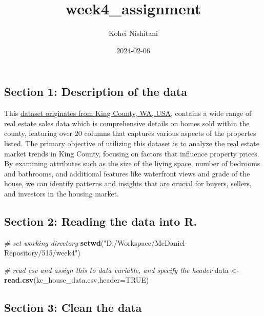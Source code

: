\documentclass[
]{article}
\title{week4\_assignment}
\author{Kohei Nishitani}
\date{2024-02-06}
\newenvironment{Shaded}{\begin{snugshade}}{\end{snugshade}}
\newcommand{\AttributeTok}[1]{\textcolor[rgb]{0.13,0.29,0.53}{#1}}
\newcommand{\CommentTok}[1]{\textcolor[rgb]{0.56,0.35,0.01}{\textit{#1}}}
\newcommand{\ConstantTok}[1]{\textcolor[rgb]{0.56,0.35,0.01}{#1}}
\newcommand{\FunctionTok}[1]{\textcolor[rgb]{0.13,0.29,0.53}{\textbf{#1}}}
\newcommand{\NormalTok}[1]{#1}
\newcommand{\OtherTok}[1]{\textcolor[rgb]{0.56,0.35,0.01}{#1}}
\newcommand{\StringTok}[1]{\textcolor[rgb]{0.31,0.60,0.02}{#1}}
\begin{document}
\maketitle

{
\setcounter{tocdepth}{2}
\tableofcontents
}
\hypertarget{section-1-description-of-the-data}{%
\subsection{Section 1: Description of the
data}\label{section-1-description-of-the-data}}

This
\href{https://www.kaggle.com/datasets/harlfoxem/housesalesprediction/data}{dataset
originates from King County, WA, USA}, contains a wide range of real
estate sales data which is comprehensive details on homes sold within
the county, featuring over 20 columns that captures various aspects of
the propertes listed. The primary objective of utilizing this dataset is
to analyze the real estate market trends in King County, focusing on
factors that influence property prices. By examining attributes such as
the size of the living space, number of bedrooms and bathrooms, and
additional features like waterfront views and grade of the house, we can
identify patterns and insights that are crucial for buyers, sellers, and
investors in the housing market.

\hypertarget{section-2-reading-the-data-into-r.}{%
\subsection{Section 2: Reading the data into
R.}\label{section-2-reading-the-data-into-r.}}

\begin{Shaded}
\begin{Highlighting}[]
\CommentTok{\# set working directory}
\FunctionTok{setwd}\NormalTok{(}\StringTok{"D:/Workspace/McDaniel{-}Repository/515/week4"}\NormalTok{)}

\CommentTok{\# read csv and assign this to data variable, and specify the header}
\NormalTok{data }\OtherTok{\textless{}{-}} \FunctionTok{read.csv}\NormalTok{(}\StringTok{\textquotesingle{}kc\_house\_data.csv\textquotesingle{}}\NormalTok{,}\AttributeTok{header=}\ConstantTok{TRUE}\NormalTok{)}
\end{Highlighting}
\end{Shaded}

\hypertarget{section-3-clean-the-data}{%
\subsection{Section 3: Clean the data}\label{section-3-clean-the-data}}
\end{document}
